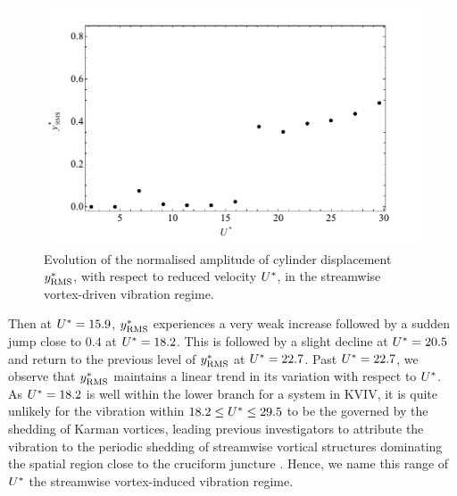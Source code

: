 \documentclass[oneside]{utmthesis}
\begin{document}
\begin{figure}
  \centering
  \includegraphics[width=1\textwidth]{figs/yStrRMS1}
  \caption{Evolution of the normalised \rms{} amplitude of cylinder displacement $y^{*}_{\text{RMS}}$, with respect to reduced velocity $U^{*}$, in the streamwise vortex-driven vibration regime.} \label{fig:yStrRMS1}
\end{figure}

Then at $U^{*} = 15.9$, $y^{*}_{\text{RMS}}$ experiences a very weak increase followed by a sudden jump close to $0.4$ at $U^{*} = 18.2$. This is followed by a slight decline at $U^{*} = 20.5$ and return to the previous level of $y^{*}_{\text{RMS}}$ at $U^{*} = 22.7$. Past $U^{*} = 22.7$, we observe that $y^{*}_{\text{RMS}}$ maintains a linear trend in its variation with respect to $U^{*}$. As $U^{*} = 18.2$ is well within the lower branch for a system in KVIV, it is quite unlikely for the vibration within $18.2 \leq U^{*} \leq 29.5$ to be the governed by the shedding of Karman vortices, leading previous investigators to attribute the vibration to the periodic shedding of streamwise vortical structures dominating the spatial region close to the cruciform juncture \citep{Shirakashi1989,Hemsuwan2018b,Hemsuwan2018d}. Hence, we name this range of $U^{*}$ the streamwise vortex-induced vibration regime.
\end{document}
